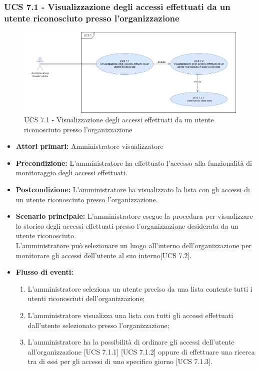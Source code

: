 \subsubsection{UCS 7.1 - Visualizzazione degli accessi effettuati da un utente riconosciuto presso l'organizzazione}
\begin{figure}[h]
	\centering
	\includegraphics[scale=0.4]{sezioni/UseCase/Immagini/UCS7.png}
	\caption{UCS 7.1 - Visualizzazione degli accessi effettuati da un utente riconosciuto presso l'organizzazione}
\end{figure}
\begin{itemize}
	\item \textbf{Attori primari:} Amministratore visualizzatore
	\item \textbf{Precondizione:} L'amministratore ha effettuato l'accesso alla funzionalità di monitoraggio degli accessi effettuati.
	\item \textbf{Postcondizione:} L'amministratore ha visualizzato la lista con gli accessi di un utente riconosciuto presso l'organizzazione.
	\item \textbf{Scenario principale:} L'amministratore esegue la procedura per visualizzare lo storico degli accessi effettuati presso l'organizzazione desiderata da un utente riconosciuto.\\
	L'amministratore può selezionare un luogo all'interno dell'organizzazione per monitorare gli accessi dell'utente al suo interno[UCS 7.2].
	\item \textbf{Flusso di eventi:}
	\begin{enumerate}
	\item L'amministratore seleziona un utente preciso da una lista contente tutti i utenti riconosciuti dell'organizzazione;
	\item L'amministratore visualizza una lista con tutti gli accessi effettuati dall'utente selezionato presso l'organizzazione;
	\item L'amministratore ha la possibilità di ordinare gli accessi dell'utente all'organizzazione [UCS 7.1.1] [UCS 7.1.2] oppure di effettuare una ricerca tra di essi per gli accessi di uno specifico giorno [UCS 7.1.3].
	\end{enumerate}
\end{itemize}

